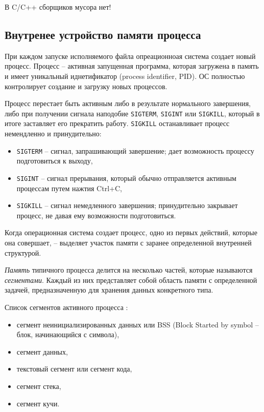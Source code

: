 \documentclass[%
	11pt,
	a4paper,
	utf8,
		]{article}
\begin{document}
{\color{red}В C/C++ сборщиков мусора нет!}

\subsection{Внутренее устройство памяти процесса}

При каждом запуске исполняемого файла опреационноая система создает новый процесс. Процесс -- активная запущенная программа, которая загружена в память и имеет уникальный иднетификатор (process identifier, PID). ОС полностью контролирует создание и загрузку новых процессов.

Процесс перестает быть активным либо в результате нормального завершения, либо при получении сигнала наподобие \verb|SIGTERM|, \verb|SIGINT| или \verb|SIGKILL|, который в итоге заставляет его прекратить работу. \verb|SIGKILL| останавливает процесс немендленно и принудительно:
\begin{itemize}
	\item \verb|SIGTERM| -- сигнал, запрашивающий завершение; дает возможность процессу подготовиться к выходу,
	
	\item \verb|SIGINT| -- сигнал прерывания, который обычно отправляется активным процессам путем нажтия Ctrl+C,
	
	\item \verb|SIGKILL| -- сигнал немедленного завершения; принудительно закрывает процесс, не давая ему возможности подготовиться.
\end{itemize}

Когда операционная система создает процесс, одно из первых действий, которые она совершает, -- выделяет участок памяти с заранее определенной внутренней структурой.

\emph{Память} типичного процесса делится на несколько частей, которые называются \emph{сегментами}. Каждый из них представляет собой область памяти с определенной задачей, предназначенную для хранения данных конкретного типа. 

Список сегментов активного процесса \cite[]{amini-extreme-c:2022}:
\begin{itemize}
	\item сегмент неинициализированных данных или BSS (Block Started by symbol -- блок, начинающийся с символа),
	
	\item сегмент данных,
	
	\item текстовый сегмент или сегмент кода,
	
	\item сегмент стека,
	
	\item сегмент кучи.
\end{itemize}
\end{document}
